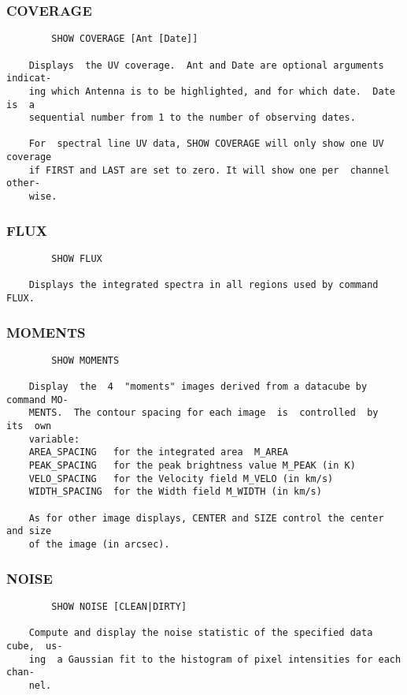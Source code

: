\subsubsection{COVERAGE}
\begin{verbatim}
        SHOW COVERAGE [Ant [Date]]

    Displays  the UV coverage.  Ant and Date are optional arguments indicat-
    ing which Antenna is to be highlighted, and for which date.  Date  is  a
    sequential number from 1 to the number of observing dates.

    For  spectral line UV data, SHOW COVERAGE will only show one UV coverage
    if FIRST and LAST are set to zero. It will show one per  channel  other-
    wise.

\end{verbatim}
\subsubsection{FLUX}
\begin{verbatim}
        SHOW FLUX

    Displays the integrated spectra in all regions used by command FLUX.

\end{verbatim}
\subsubsection{MOMENTS}
\begin{verbatim}
        SHOW MOMENTS

    Display  the  4  "moments" images derived from a datacube by command MO-
    MENTS.  The contour spacing for each image  is  controlled  by  its  own
    variable:
    AREA_SPACING   for the integrated area  M_AREA
    PEAK_SPACING   for the peak brightness value M_PEAK (in K)
    VELO_SPACING   for the Velocity field M_VELO (in km/s)
    WIDTH_SPACING  for the Width field M_WIDTH (in km/s)

    As for other image displays, CENTER and SIZE control the center and size
    of the image (in arcsec).

\end{verbatim}
\subsubsection{NOISE}
\begin{verbatim}
        SHOW NOISE [CLEAN|DIRTY]

    Compute and display the noise statistic of the specified data cube,  us-
    ing  a Gaussian fit to the histogram of pixel intensities for each chan-
    nel.

\end{verbatim}

